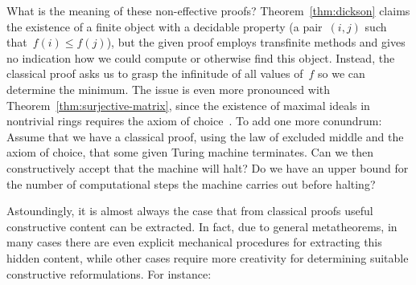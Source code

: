 \documentclass[10pt,reqno,a4paper,openany]{amsbook}
\theoremstyle{definition}
\theoremstyle{plain}
\theoremstyle{remark}
\newcommand{\?}{\,{:}\,}
\renewcommand{\_}{\mathpunct{.}\,}
\begin{document}
What is the meaning of these non-effective proofs? Theorem~\ref{thm:dickson}
claims the existence of a finite object with a decidable property (a
pair~$(i,j)$ such that~$f(i) \leq f(j)$), but the given proof employs
transfinite methods and gives no indication how we could compute or otherwise
find this object. Instead, the classical proof asks us to grasp the infinitude
of all values of~$f$ so we can determine the minimum. The issue is even more
pronounced with Theorem~\ref{thm:surjective-matrix}, since the existence of
maximal ideals in nontrivial rings requires the axiom of
choice~\cite{scott:prime-ideals,hodges:krull,banaschewski:krull,erne:krull,howard-rubin:ac}.
To add one more conundrum: Assume that we have a classical proof, using the law
of excluded middle and the axiom of choice, that some given Turing machine
terminates. Can we then constructively accept that the machine will halt? Do we
have an upper bound for the number of computational steps the machine carries
out before halting?

Astoundingly, it is almost always the case that from classical proofs useful
constructive content can be extracted. In fact, due to general metatheorems,
in many cases there are even explicit mechanical procedures for extracting this
hidden content, while other cases require more creativity for determining
suitable constructive reformulations. For instance:
\end{document}
